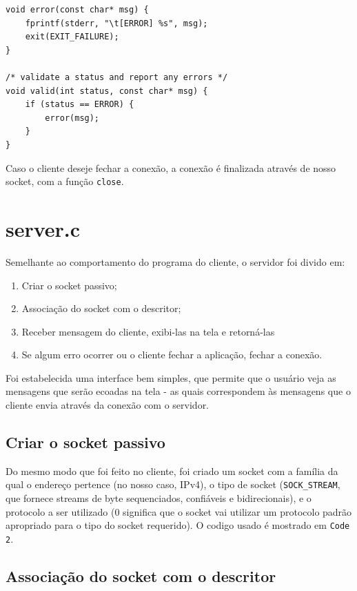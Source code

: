 \documentclass[10pt,twocolumn,letterpaper]{article}
\begin{document}
    \begin{lstlisting}[caption={API com verificação de erros, 
        utilizada tanto no cliente quanto servidor}, label=Algorithm]
void error(const char* msg) {
    fprintf(stderr, "\t[ERROR] %s", msg);
    exit(EXIT_FAILURE);
}

/* validate a status and report any errors */
void valid(int status, const char* msg) {
    if (status == ERROR) {
        error(msg);
    }
}
    \end{lstlisting}

    Caso o cliente deseje fechar a conexão, a conexão é finalizada através de nosso socket,
com a função \texttt{close}.

\section{server.c}
Semelhante ao comportamento do programa do cliente, o servidor foi divido em:

\begin{enumerate}
    \item Criar o socket passivo;
    \item Associação do socket com o descritor;
    \item Receber mensagem do cliente, exibi-las na tela e retorná-las
    \item Se algum erro ocorrer ou o cliente fechar a aplicação, fechar a conexão.
\end{enumerate}

    Foi estabelecida uma interface bem simples, que permite que o usuário veja as
    mensagens que serão ecoadas na tela - as quais correspondem às mensagens que
    o cliente envia através da conexão com o servidor.

\subsection{Criar o socket passivo}

Do mesmo modo que foi feito no cliente, foi criado um socket com a família da qual o endereço pertence (no nosso caso, IPv4), o tipo de socket (\texttt{SOCK\_STREAM}, que fornece streams de byte sequenciados, confiáveis e bidirecionais), e o protocolo a ser utilizado (0 significa que o socket vai utilizar um protocolo padrão apropriado para o tipo do socket requerido). O codigo usado é mostrado em \texttt{Code 2}.

\subsection{Associação do socket com o descritor}
\end{document}
